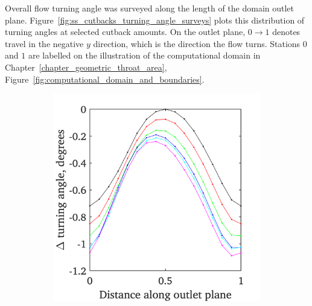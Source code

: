 \documentclass[a4paper, 11pt, oneside]{report}
\begin{document}
Overall flow turning angle was surveyed along the length of the domain outlet plane. Figure~\ref{fig:ss_cutbacks_turning_angle_surveys} plots this distribution of turning angles at selected cutback amounts. On the outlet plane, $0\rightarrow1$ denotes travel in the negative $y$ direction, which is the direction the flow turns. Stations $0$ and $1$ are labelled on the illustration of the computational domain in Chapter~\ref{chapter_geometric_throat_area}, Figure~\ref{fig:computational_domain_and_boundaries}.

\begin{figure}[H]
	\centering
	\begin{subfigure}{.45\textwidth}
		\centering
		\includegraphics[width=\linewidth]{figs/ss_cutbacks_turning_angle_surveys.png}
	\end{subfigure}
	\begin{subfigure}{.1125\textwidth}
		\centering

\end{subfigure}
\end{figure}
\end{document}
